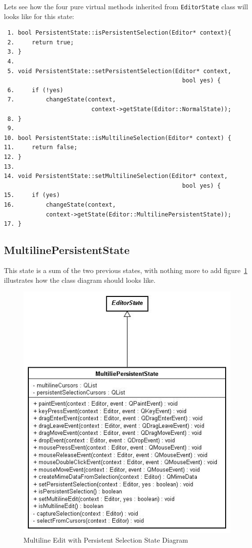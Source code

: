 \documentclass[11pt,a4paper]{report}
\begin{document}
Lets see how the four pure virtual methods inherited from \texttt{EditorState} class will looks like for this state:

\begin{verbatim}
 1. bool PersistentState::isPersistentSelection(Editor* context){
 2.     return true;
 3. }
 4.
 5. void PersistentState::setPersistentSelection(Editor* context, 
                                                   bool yes) {
 6.     if (!yes)
 7.         changeState(context, 
                         context->getState(Editor::NormalState));
 8. }
 9.
10. bool PersistentState::isMultilineSelection(Editor* context) {
11.     return false;
12. }
13.
14. void PersistentState::setMultilineSelection(Editor* context, 
                                                   bool yes) {
15.     if (yes)
16.         changeState(context, 
            context->getState(Editor::MultilinePersistentState));
17. }
\end{verbatim}

\subsection{MultilinePersistentState}
This state is a sum of the two previous states, with nothing more to add figure~\ref{multilinepersistentstate} illustrates how the class diagram should looks like.

\begin{figure}[hbt]
\centering
\includegraphics{images/multilinepersistentstate.jpg}
\caption{Multiline Edit with Persistent Selection State Diagram} \label{multilinepersistentstate}
\end{figure}
\end{document}

